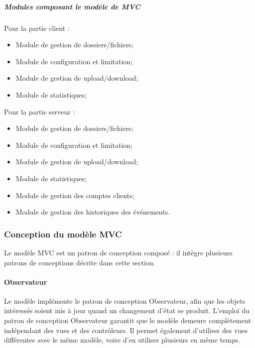 \documentclass[10pt,a4paper]{report}
\begin{document}
			\subparagraph{Modules composant le modèle de MVC}
			\begin{flushleft}
			Pour la partie client :
				\begin{itemize}
					\item Module de gestion de dossiers/fichiers;
					\item Module de configuration et limitation;
					\item Module de gestion de upload/download;
					\item Module de statistiques;
				\end{itemize}
			Pour la partie serveur :
			\begin{itemize}
					\item Module de gestion de dossiers/fichiers;
					\item Module de configuration et limitation;
					\item Module de gestion de upload/download;
					\item Module de statistiques;
					\item Module de gestion des comptes clients;
					\item Module de gestion des historiques des événements.
				\end{itemize}
			\end{flushleft}

			
		\subsubsection{Conception du modèle MVC}
		
		Le modèle MVC est un patron de conception composé : il intègre plusieurs patrons de conceptions décrite dans cette section.
		
		\paragraph{Observateur}
		\begin{flushleft}
				Le modèle implémente le patron de conception Observateur, afin que les objets intéressés soient mis à jour quand un changement d’état se produit. L’emploi du patron de conception Observateur garantit que le modèle demeure complètement indépendant des vues et des contrôleurs. Il permet également d’utiliser des vues différentes avec le même modèle, voire d’en utiliser plusieurs en même temps.

		\end{flushleft}
\end{document}
